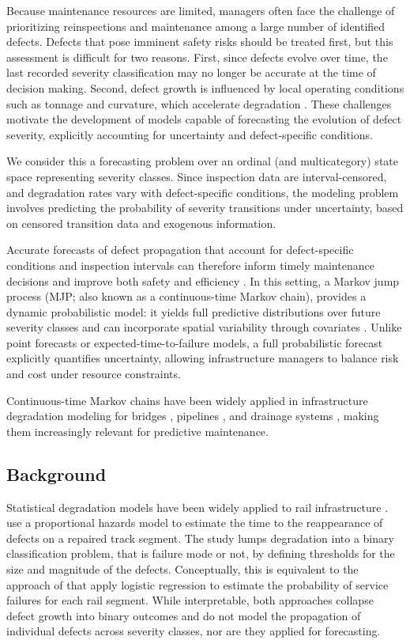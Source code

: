 \documentclass{article}
\begin{document}
Because maintenance resources are limited, managers often face the challenge of prioritizing reinspections and maintenance among a large number of identified defects.
Defects that pose imminent safety risks should be treated first, but this assessment is difficult for two reasons. 
First, since defects evolve over time, the last recorded severity classification may no longer be accurate at the time of decision making.
Second, defect growth is influenced by local operating conditions such as tonnage and curvature, which accelerate degradation \citep{bai2017a,Kumar2008HolisticSweden}.
These challenges motivate the development of models capable of forecasting the evolution of defect severity, explicitly accounting for uncertainty and defect-specific conditions.

We consider this a forecasting problem over an ordinal (and multicategory) state space representing severity classes. Since inspection data are interval-censored, and degradation rates vary with defect-specific conditions, the modeling problem involves predicting the probability of severity transitions under uncertainty, based on censored transition data and exogenous information.

Accurate forecasts of defect propagation that account for defect-specific conditions and inspection intervals can therefore inform timely maintenance decisions and improve both safety and efficiency \citep{Binder2023}. In this setting, a Markov jump process (MJP; also known as a continuous-time Markov chain), provides a dynamic probabilistic model: it yields full predictive distributions over future severity classes and can incorporate spatial variability through covariates \citep{bisgaard2024A}. Unlike point forecasts or expected-time-to-failure models, a full probabilistic forecast explicitly quantifies uncertainty, allowing infrastructure managers to balance risk and cost under resource constraints.

Continuous-time Markov chains have been widely applied in infrastructure degradation modeling for bridges \citep{Mizutani2023RegimeSwitching}, pipelines \citep{JimenezRoa2024Nonhomogeneous}, and drainage systems \citep{Wu2021ConditionPrediction}, making them increasingly relevant for predictive maintenance. 

\subsection{Background} \label{sec:background}Statistical degradation models have been widely applied to rail infrastructure \citep{Davari2021AIndustry}.
\citet{ghofrani2019a} use a proportional hazards model to estimate the time to the reappearance of defects on a repaired track segment. The study lumps degradation into a binary classification problem, that is failure mode or not, by defining thresholds for the size and magnitude of the defects. Conceptually, this is equivalent to the approach of \citet{dick2003a} that apply logistic regression to estimate the probability of service failures for each rail segment. While interpretable, both approaches collapse defect growth into binary outcomes and do not model the propagation of individual defects across severity classes, nor are they applied for forecasting.
\end{document}
